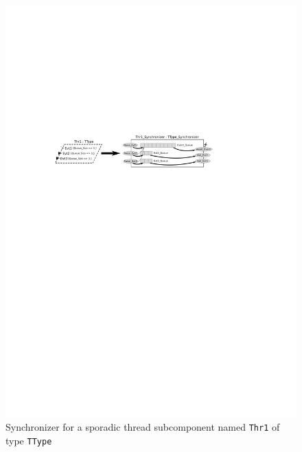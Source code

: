 \begin{figure}
\centering
\includegraphics[scale=1.4]{figs/synchronizer}
\caption{Synchronizer for a sporadic thread subcomponent named
  \texttt{Thr1} of type \texttt{TType}}
\label{fig:synchronizer}
\end{figure}

